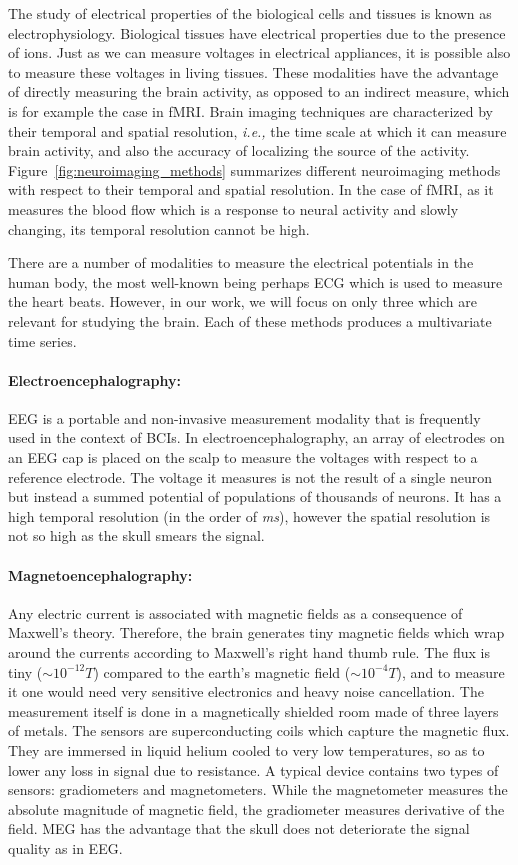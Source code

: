 The study of electrical properties of the biological cells and tissues is known as electrophysiology. 
Biological tissues have electrical properties due to the presence of ions. Just as we can measure voltages in electrical appliances, it is possible also to measure these voltages in living tissues. 
These modalities have the advantage of directly measuring the brain activity, as opposed to an indirect measure, which is for example the case in \ac{fMRI}.
Brain imaging techniques are characterized by their temporal and spatial resolution, \textit{i.e.,} the time scale at which it can measure brain activity, and also the accuracy of localizing the source of the activity. Figure~\ref{fig:neuroimaging_methods} summarizes different neuroimaging methods with respect to their temporal and spatial resolution. In the case of \ac{fMRI}, as it measures the blood flow which is a response to neural activity and slowly changing, its temporal resolution cannot be high. 

There are a number of modalities to measure the electrical potentials in the human body, the most well-known being perhaps \ac{ECG} which is used to measure the heart beats. However, in our work, we will focus on only three which are relevant for studying the brain. Each of these methods produces a multivariate time series.

\paragraph{Electroencephalography: } \Ac{EEG} is a portable and non-invasive measurement modality that is frequently used in the context of \acp{BCI}. 
In electroencephalography, an array of electrodes on an \ac{EEG} cap is placed on the scalp to measure the voltages with respect to a reference electrode. 
The voltage it measures is not the result of a single neuron but instead a summed potential of populations of thousands of neurons. It has a high temporal resolution (in the order of \emph{ms}), however the spatial resolution is not so high as the skull smears the signal.

\paragraph{Magnetoencephalography: } Any electric current is associated with magnetic fields as a consequence of Maxwell's theory. 
Therefore, the brain generates tiny magnetic fields which  wrap around the currents according to Maxwell's right hand thumb rule. The flux is tiny ($\sim10^{-12}T$) compared to the earth's magnetic field ($\sim10^{-4}T$), and to measure it one would need very sensitive electronics and heavy noise cancellation. The measurement itself is done in a magnetically shielded room made of three layers of metals. 
The sensors are superconducting coils which capture the magnetic flux. They are immersed in liquid helium cooled to very low temperatures, so as to lower any loss in signal due to resistance. A typical device contains two types of sensors: gradiometers and magnetometers. While the magnetometer measures the absolute magnitude of magnetic field, the gradiometer measures derivative of the field. \Ac{MEG} has the advantage that the skull does not deteriorate the signal quality as in \ac{EEG}.

